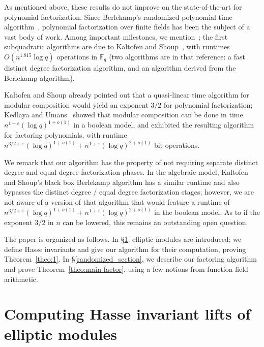 \documentclass[11pt]{article}
\theoremstyle{definition}
\def\F{\ensuremath{\mathbb{F}}}
\begin{document}
As mentioned above, these results do not improve on the
state-of-the-art for polynomial factorization.
Since Berlekamp's randomized polynomial time algorithm~\cite{ber},
polynomial factorization over finite fields has been the subject of a
vast body of work. Among important milestones, we
mention~\cite{cz,gs}; the first subquadratic algorithms are due to
Kaltofen and Shoup~\cite{ks}, with runtimes $O(n^{1.815}\log q)$
operations in $\F_q$  (two algorithms are in that reference:
a fast distinct degree factorization algorithm, and an algorithm
derived from the Berlekamp algorithm).

Kaltofen and Shoup already pointed out that a quasi-linear time
algorithm for modular composition would yield an exponent $3/2$ for
polynomial factorization; Kedlaya and Umans~\cite{ku} showed that
modular composition can be done in time $n^{1+\varepsilon} (\log
q)^{1+o(1)}$ in a boolean model, and exhibited the resulting
algorithm for factoring polynomials, with runtime $n^{3/2+\varepsilon}
(\log q)^{1 +o(1)} + n^{1+\varepsilon}(\log q)^{2+o(1)}$ bit
operations. 

We remark that our algorithm has the property of not requiring
separate distinct degree and equal degree factorization phases. In the
algebraic model, Kaltofen and Shoup's black box Berlekamp algorithm
has a similar runtime and also bypasses the distinct degree / equal
degree factorization stages; however, we are not aware of a version of
that algorithm that would feature a runtime of $n^{3/2+\varepsilon} (\log q)^{1 +o(1)} +
n^{1+\varepsilon}(\log q)^{2+o(1)}$ in the boolean model.
As to if the exponent $3/2$ in $n$ can be lowered, this remains an
outstanding open question.


The paper is organized as follows. In \S\ref{drinfeld_section},
elliptic modules are introduced; we define Hasse invariants and give
our algorithm for their computation, proving Theorem~\ref{theo:1}.  In
\S\ref{randomized_section}, we describe our factoring algorithm and
prove Theorem~\ref{theo:main-factor}, using a few notions from
function field arithmetic.




\section{Computing Hasse invariant lifts of elliptic modules}\label{drinfeld_section}
\end{document}
